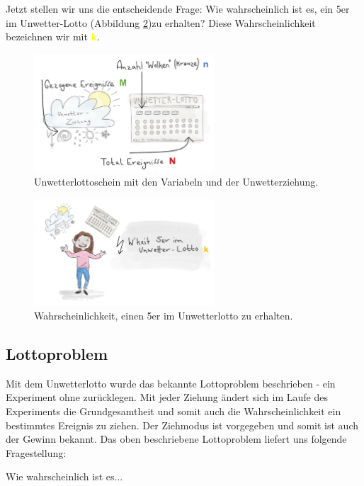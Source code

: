\begin{refsection}
Jetzt stellen wir uns die entscheidende Frage: 
Wie wahrscheinlich ist es, ein 5er im Unwetter-Lotto (Abbildung \ref{WahrscheinlichkeitUnwetterlotto})zu erhalten? Diese Wahrscheinlichkeit bezeichnen wir mit \textcolor{yellow}{\textbf{k}}.

\begin{figure}
\centering
\includegraphics[width=0.6\textwidth]{extrem/Lottoscheinausgefuellt.pdf}
\caption{Unwetterlottoschein mit den Variabeln und der Unwetterziehung.}
\label{Lottoscheinausgefuellt}
\end{figure}

\begin{figure}
\centering
\includegraphics[width=0.6\textwidth]{extrem/wkeitlotto.pdf}
\caption{Wahrscheinlichkeit, einen 5er im Unwetterlotto zu erhalten.}
\label{WahrscheinlichkeitUnwetterlotto}
\end{figure}

\subsection{Lottoproblem} \label{Lottoproblem}
Mit dem Unwetterlotto wurde das bekannte Lottoproblem beschrieben - ein Experiment ohne zurücklegen. Mit jeder Ziehung ändert sich im Laufe des Experiments die Grundgesamtheit und somit auch die Wahrscheinlichkeit ein bestimmtes Ereignis zu ziehen. Der Ziehmodus ist vorgegeben und somit ist auch der Gewinn bekannt.
Das oben beschriebene Lottoproblem liefert uns folgende Fragestellung:


Wie wahrscheinlich ist es...


\end{refsection}
